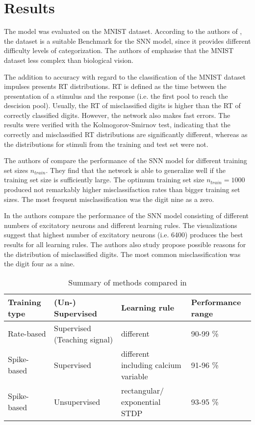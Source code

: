 \section{Results}
\label{sec:result}
The model was evaluated on the MNIST dataset.
According to the authors of \cite{STDP_like}, the dataset is a suitable Benchmark for the \ac{SNN} model, 
since it provides different difficulty levels of categorization.
The authors of \cite{STDP_like} emphasise that the MNIST dataset less complex than biological vision.

The addition to accuracy with regard to the classification of the MNIST dataset impulses \cite{STDP_like} presents \ac{RT} distributions.
\ac{RT} is defined as the time between the presentation of a stimulus and the response (i.e. the first pool to reach the descision pool).
Usually, the \ac{RT} of misclassified digits is higher than the \ac{RT} of correctly classified digits.
However, the network also makes fast errors.
The results were verified with the Kolmogorov-Smirnov test, 
indicating that the correctly and misclassified \ac{RT} distributions are significantly different, 
whereas as the distributions for stimuli from the training and test set were not.

The authors of \cite{STDP_like} compare the performance of the \ac{SNN} model for different training set sizes $n_{train}$.
They find that the network is able to generalize well if the training set size is sufficiently large.
The optimum training set size $n_{train} = 1000$ produced not remarkably higher misclassifaction rates than bigger training set sizes.
The most frequent misclassification was the digit nine as a zero.


In \cite{SNN} the authors compare the performance of the \ac{SNN} model consisting of different numbers of excitatory neurons and different learning rules.
The visualizations suggest that highest number of excitatory neurons (i.e. 6400) produces the best results for all learning rules.
The authors also study propose possible reasons for the distribution of misclassified digits.
The most common misclassification was the digit four as a nine.

\begin{table}[]
    \begin{tabular}{|l|l|l|l|}
    \hline
    \textbf{Training type} & \textbf{(Un-) Supervised}    & \textbf{Learning rule}               & \textbf{Performance range} \\ \hline
    Rate-based             & Supervised (Teaching signal) & different                            & 90-99 \%                   \\ \hline
    Spike-based            & Supervised                   & different including calcium variable & 91-96 \%                   \\ \hline
    Spike-based            & Unsupervised                 & rectangular/ exponential STDP        & 93-95 \%                   \\ \hline
    \end{tabular}
    \caption{Summary of methods compared in \cite{SNN}}
    \label{tab:different-training-types}
\end{table}


